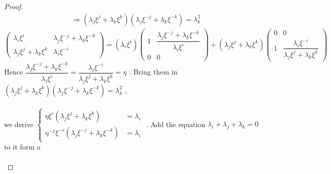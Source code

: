 \documentclass{article}
\begin{document}
\begin{proof}
\begin{align*}
        &\Rightarrow(\lambda_j\xi^{\scriptscriptstyle j}+\lambda_k\xi^{\scriptscriptstyle k})(\lambda_j\xi^{\scriptscriptstyle-j}+\lambda_k\xi^{\scriptscriptstyle-k})=\lambda_k^{\scriptscriptstyle2}
\end{align*}
\begin{equation*}
        \begin{pmatrix}
            \lambda_i\xi^{\scriptscriptstyle i}&\lambda_j\xi^{\scriptscriptstyle-j}+\lambda_k\xi^{\scriptscriptstyle-k}\\
            \lambda_j\xi^{\scriptscriptstyle j}+\lambda_k\xi^{\scriptscriptstyle k}&\lambda_i\xi^{\scriptscriptstyle-i}
        \end{pmatrix}=(\lambda_i\xi^{\scriptscriptstyle i})
        \begin{pmatrix}
            1&\dfrac{\lambda_j\xi^{\scriptscriptstyle-j}+\lambda_k\xi^{\scriptscriptstyle-k}}{\lambda_i\xi^{\scriptscriptstyle i}}\\
            0&0
        \end{pmatrix}+(\lambda_j\xi^{\scriptscriptstyle j}+\lambda_k\xi^{\scriptscriptstyle k})
        \begin{pmatrix}
            0&0\\
            1&\dfrac{\lambda_i\xi^{\scriptscriptstyle-i}}{\lambda_j\xi^{\scriptscriptstyle j}+\lambda_k\xi^{\scriptscriptstyle k}}
        \end{pmatrix}
\end{equation*}
Hence $\dfrac{\lambda_j\xi^{\scriptscriptstyle-j}+\lambda_k\xi^{\scriptscriptstyle-k}}{\lambda_i\xi^{\scriptscriptstyle i}}=\dfrac{\lambda_i\xi^{\scriptscriptstyle-i}}{\lambda_j\xi^{\scriptscriptstyle j}+\lambda_k\xi^{\scriptscriptstyle k}}=\eta$ . Bring them in $(\lambda_j\xi^{\scriptscriptstyle j}+\lambda_k\xi^{\scriptscriptstyle k})(\lambda_j\xi^{\scriptscriptstyle-j}+\lambda_k\xi^{\scriptscriptstyle-k})=\lambda_k^{\scriptscriptstyle2}$ ,\\
\quad\\
we derive 
$
\left\{
\begin{array}{ll}
\eta\xi^{\scriptscriptstyle i}(\lambda_j\xi^{\scriptscriptstyle j}+\lambda_k\xi^{\scriptscriptstyle k})&=\lambda_i\\
\eta^{\scriptscriptstyle-1}\xi^{\scriptscriptstyle -i}(\lambda_j\xi^{\scriptscriptstyle-j}+\lambda_k\xi^{\scriptscriptstyle-k})&=\lambda_i
\end{array}
\right.
$ . 
Add the equation $\lambda_i+\lambda_j+\lambda_k=0$ to it form a\\
\quad\\

\end{proof}
\end{document}
